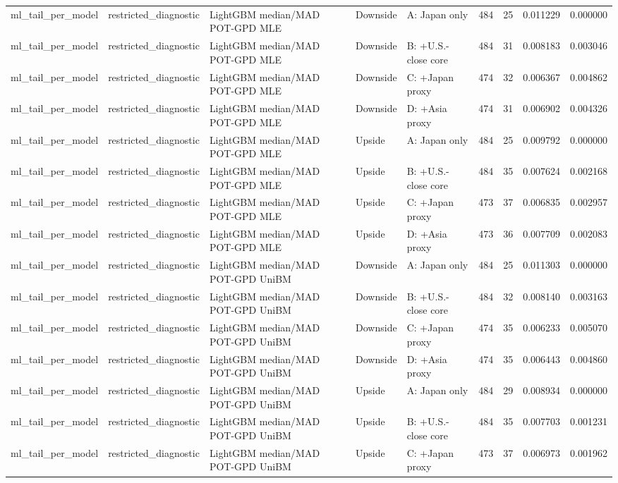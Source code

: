 \begin{tabular}{lllllrrrr}
ml\_tail\_per\_model & restricted\_diagnostic & LightGBM median/MAD POT-GPD MLE & Downside & A: Japan only & 484 & 25 & 0.011229 & 0.000000 \\
ml\_tail\_per\_model & restricted\_diagnostic & LightGBM median/MAD POT-GPD MLE & Downside & B: +U.S.-close core & 484 & 31 & 0.008183 & 0.003046 \\
ml\_tail\_per\_model & restricted\_diagnostic & LightGBM median/MAD POT-GPD MLE & Downside & C: +Japan proxy & 474 & 32 & 0.006367 & 0.004862 \\
ml\_tail\_per\_model & restricted\_diagnostic & LightGBM median/MAD POT-GPD MLE & Downside & D: +Asia proxy & 474 & 31 & 0.006902 & 0.004326 \\
ml\_tail\_per\_model & restricted\_diagnostic & LightGBM median/MAD POT-GPD MLE & Upside & A: Japan only & 484 & 25 & 0.009792 & 0.000000 \\
ml\_tail\_per\_model & restricted\_diagnostic & LightGBM median/MAD POT-GPD MLE & Upside & B: +U.S.-close core & 484 & 35 & 0.007624 & 0.002168 \\
ml\_tail\_per\_model & restricted\_diagnostic & LightGBM median/MAD POT-GPD MLE & Upside & C: +Japan proxy & 473 & 37 & 0.006835 & 0.002957 \\
ml\_tail\_per\_model & restricted\_diagnostic & LightGBM median/MAD POT-GPD MLE & Upside & D: +Asia proxy & 473 & 36 & 0.007709 & 0.002083 \\
ml\_tail\_per\_model & restricted\_diagnostic & LightGBM median/MAD POT-GPD UniBM & Downside & A: Japan only & 484 & 25 & 0.011303 & 0.000000 \\
ml\_tail\_per\_model & restricted\_diagnostic & LightGBM median/MAD POT-GPD UniBM & Downside & B: +U.S.-close core & 484 & 32 & 0.008140 & 0.003163 \\
ml\_tail\_per\_model & restricted\_diagnostic & LightGBM median/MAD POT-GPD UniBM & Downside & C: +Japan proxy & 474 & 35 & 0.006233 & 0.005070 \\
ml\_tail\_per\_model & restricted\_diagnostic & LightGBM median/MAD POT-GPD UniBM & Downside & D: +Asia proxy & 474 & 35 & 0.006443 & 0.004860 \\
ml\_tail\_per\_model & restricted\_diagnostic & LightGBM median/MAD POT-GPD UniBM & Upside & A: Japan only & 484 & 29 & 0.008934 & 0.000000 \\
ml\_tail\_per\_model & restricted\_diagnostic & LightGBM median/MAD POT-GPD UniBM & Upside & B: +U.S.-close core & 484 & 35 & 0.007703 & 0.001231 \\
ml\_tail\_per\_model & restricted\_diagnostic & LightGBM median/MAD POT-GPD UniBM & Upside & C: +Japan proxy & 473 & 37 & 0.006973 & 0.001962 \\

\end{tabular}
